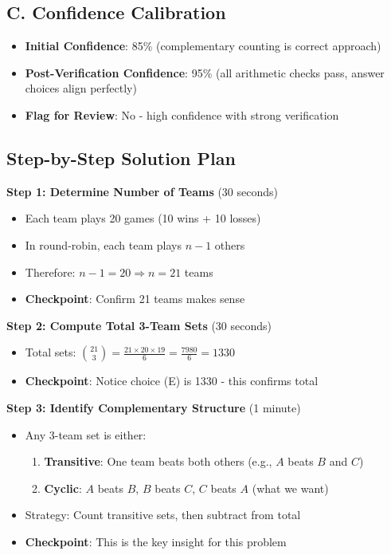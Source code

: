 \documentclass[]{article}
\begin{document}
\begin{verificationbox}
\subsection*{C. Confidence Calibration}
\begin{itemize}[leftmargin=*]
    \item \textbf{Initial Confidence}: 85\% (complementary counting is correct approach)
    \item \textbf{Post-Verification Confidence}: 95\% (all arithmetic checks pass, answer choices align perfectly)
    \item \textbf{Flag for Review}: No - high confidence with strong verification
\end{itemize}
\end{verificationbox}

\begin{solutionbox}
\subsection*{Step-by-Step Solution Plan}

\textbf{Step 1: Determine Number of Teams} (30 seconds)
\begin{itemize}[leftmargin=*]
    \item Each team plays 20 games (10 wins + 10 losses)
    \item In round-robin, each team plays $n-1$ others
    \item Therefore: $n - 1 = 20 \Rightarrow n = 21$ teams
    \item \textbf{Checkpoint}: Confirm 21 teams makes sense
\end{itemize}

\textbf{Step 2: Compute Total 3-Team Sets} (30 seconds)
\begin{itemize}[leftmargin=*]
    \item Total sets: $\binom{21}{3} = \frac{21 \times 20 \times 19}{6} = \frac{7980}{6} = 1330$
    \item \textbf{Checkpoint}: Notice choice (E) is 1330 - this confirms total
\end{itemize}

\textbf{Step 3: Identify Complementary Structure} (1 minute)
\begin{itemize}[leftmargin=*]
    \item Any 3-team set is either:
    \begin{enumerate}
        \item \textbf{Transitive}: One team beats both others (e.g., $A$ beats $B$ and $C$)
        \item \textbf{Cyclic}: $A$ beats $B$, $B$ beats $C$, $C$ beats $A$ (what we want)
    \end{enumerate}
    \item Strategy: Count transitive sets, then subtract from total
    \item \textbf{Checkpoint}: This is the key insight for this problem
\end{itemize}


\end{solutionbox}
\end{document}
